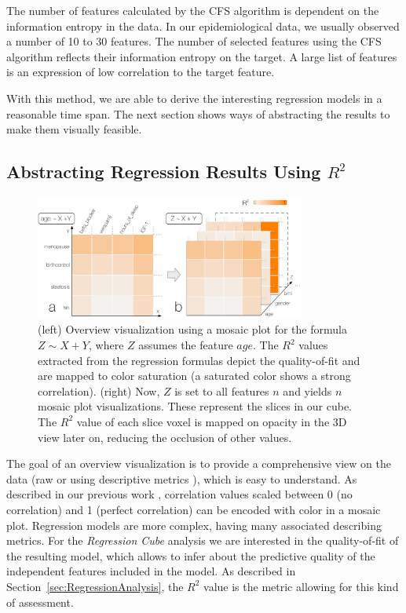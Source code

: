 \documentclass[journal]{style/vgtc} 			          %
\begin{document}
The number of features calculated by the CFS algorithm is dependent on the information entropy in the data.
In our epidemiological data, we usually observed a number of 10 to 30 features.
The number of selected features using the CFS algorithm reflects their information entropy on the target.
A large list of features is an expression of low correlation to the target feature.

With this method, we are able to derive the interesting regression models in a reasonable time span.
The next section shows ways of abstracting the results to make them visually feasible.

\subsection{Abstracting Regression Results Using $R^2$}
\begin{figure}[htb]
 \centering
 \includegraphics[width=3.5in]{figures/cube}
 \caption{
 (left) Overview visualization using a mosaic plot for the formula $Z \sim X + Y$, where $Z$ assumes the feature $age$.
 The $R^2$ values extracted from the regression formulas depict the quality-of-fit and are mapped to color saturation (a saturated color shows a strong correlation).
 (right) Now, $Z$ is set to all features $n$ and yields $n$ mosaic plot visualizations.
 These represent the slices in our cube.
 The $R^2$ value of each slice voxel is mapped on opacity in the 3D view later on, reducing the occlusion of other values.
 }
  \label{fig:Cube}
\end{figure}
The goal of an overview visualization is to provide a comprehensive view on the data (raw or using descriptive metrics \cite{Bertini}), which is easy to understand.
As described in our previous work \cite{Klemm2014VIS}, correlation values scaled between 0 (no correlation) and 1 (perfect correlation) can be encoded with color in a mosaic plot.
Regression models are more complex, having many associated describing metrics.
For the \emph{Regression Cube} analysis we are interested in the quality-of-fit of the resulting model, which allows to infer about the predictive quality of the independent features included in the model.
As described in Section~\ref{sec:RegressionAnalysis}, the $R^2$ value is the metric allowing for this kind of assessment.
\end{document}
